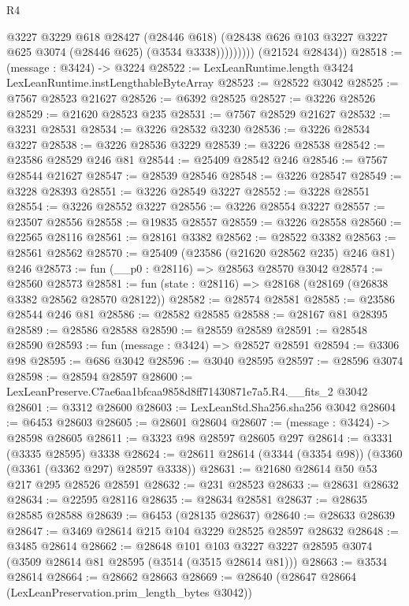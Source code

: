 \begin{lexlean}{R4}
\begin{coremodule}
                    @3227
                    @3229
                    @618
                    @28427
                    (@28446 @618)
                    (@28438 @626 @103 @3227 @3227 @625 @3074 (@28446 @625) (@3534 @3338)))))))))
      (@21524 @28434))
@28518 := (message : @3424) -> @3224
@28522 := LexLeanRuntime.length @3424 LexLeanRuntime.instLengthableByteArray
@28523 := @28522 @3042
@28525 := @7567 @28523 @21627
@28526 := @6392 @28525
@28527 := @3226 @28526
@28529 := @21620 @28523 @235
@28531 := @7567 @28529 @21627
@28532 := @3231 @28531
@28534 := @3226 @28532 @3230
@28536 := @3226 @28534 @3227
@28538 := @3226 @28536 @3229
@28539 := @3226 @28538
@28542 := @23586 @28529 @246 @81
@28544 := @25409 @28542 @246
@28546 := @7567 @28544 @21627
@28547 := @28539 @28546
@28548 := @3226 @28547
@28549 := @3228 @28393
@28551 := @3226 @28549 @3227
@28552 := @3228 @28551
@28554 := @3226 @28552 @3227
@28556 := @3226 @28554 @3227
@28557 := @23507 @28556
@28558 := @19835 @28557
@28559 := @3226 @28558
@28560 := @22565 @28116
@28561 := @28161 @3382
@28562 := @28522 @3382
@28563 := @28561 @28562
@28570 := @25409 (@23586 (@21620 @28562 @235) @246 @81) @246
@28573 := fun (__p0 : @28116) => @28563 @28570 @3042
@28574 := @28560 @28573
@28581 := fun (state : @28116) => @28168 (@28169 (@26838 @3382 @28562 @28570 @28122))
@28582 := @28574 @28581
@28585 := @23586 @28544 @246 @81
@28586 := @28582 @28585
@28588 := @28167 @81 @28395
@28589 := @28586 @28588
@28590 := @28559 @28589
@28591 := @28548 @28590
@28593 := fun (message : @3424) => @28527 @28591
@28594 := @3306 @98
@28595 := @686 @3042
@28596 := @3040 @28595
@28597 := @28596 @3074
@28598 := @28594 @28597
@28600 := LexLeanPreserve.C7ae6aa1bfcaa9858d8ff71430871e7a5.R4.__fits_2 @3042
@28601 := @3312 @28600
@28603 := LexLeanStd.Sha256.sha256 @3042
@28604 := @6453 @28603
@28605 := @28601 @28604
@28607 := (message : @3424) -> @28598 @28605
@28611 := @3323 @98 @28597 @28605 @297
@28614 := @3331 (@3335 @28595) @3338
@28624 := @28611 @28614 (@3344 (@3354 @98)) (@3360 (@3361 (@3362 @297) @28597 @3338))
@28631 := @21680 @28614 @50 @53 @217 @295 @28526 @28591
@28632 := @231 @28523
@28633 := @28631 @28632
@28634 := @22595 @28116
@28635 := @28634 @28581
@28637 := @28635 @28585 @28588
@28639 := @6453 (@28135 @28637)
@28640 := @28633 @28639
@28647 := @3469 @28614 @215 @104 @3229 @28525 @28597 @28632
@28648 := @3485 @28614
@28662 := @28648
    @101
    @103
    @3227
    @3227
    @28595
    @3074
    (@3509 @28614 @81 @28595 (@3514 (@3515 @28614 @81)))
@28663 := @3534 @28614
@28664 := @28662 @28663
@28669 := @28640 (@28647 @28664 (LexLeanPreservation.prim_length_bytes @3042))

\end{coremodule}
\end{lexlean}
